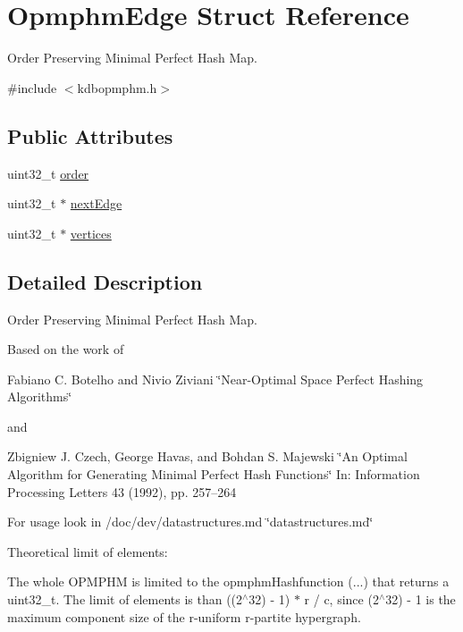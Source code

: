 \hypertarget{structOpmphmEdge}{}\section{Opmphm\+Edge Struct Reference}
\label{structOpmphmEdge}


Order Preserving Minimal Perfect Hash Map.  




{\ttfamily \#include $<$kdbopmphm.\+h$>$}

\subsection*{Public Attributes}
\begin{DoxyCompactItemize}
\item 
uint32\+\_\+t \hyperlink{structOpmphmEdge_a0d125d2d8a97f191896b816123c09d14}{order}
\item 
uint32\+\_\+t $\ast$ \hyperlink{structOpmphmEdge_a4a0e9a3d422a25a57f52530f003c3a5e}{next\+Edge}
\item 
uint32\+\_\+t $\ast$ \hyperlink{structOpmphmEdge_ae8d5721fe78750b17b5d4a9b8e3fc2b2}{vertices}
\end{DoxyCompactItemize}


\subsection{Detailed Description}
Order Preserving Minimal Perfect Hash Map. 

Based on the work of

Fabiano C. Botelho and Nivio Ziviani \char`\"{}\+Near-\/\+Optimal Space Perfect Hashing Algorithms\char`\"{}

and

Zbigniew J. Czech, George Havas, and Bohdan S. Majewski \char`\"{}\+An Optimal Algorithm for Generating Minimal Perfect Hash Functions\char`\"{} In\+: Information Processing Letters 43 (1992), pp. 257–264

For usage look in /doc/dev/datastructures.md \char`\"{}datastructures.\+md\char`\"{}

Theoretical limit of elements\+:

The whole O\+P\+M\+P\+HM is limited to the opmphm\+Hashfunction (...) that returns a uint32\+\_\+t. The limit of elements is than ((2$^\wedge$32) -\/ 1) $\ast$ r / c, since (2$^\wedge$32) -\/ 1 is the maximum component size of the r-\/uniform r-\/partite hypergraph.

